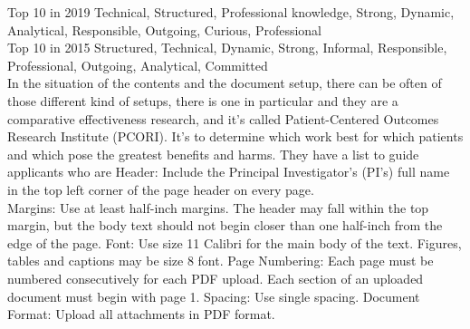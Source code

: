 Top 10 in 2019
Technical,
Structured,
Professional knowledge,
Strong,
Dynamic,
Analytical,
Responsible,
Outgoing,
Curious,
Professional \\

Top 10 in 2015
Structured,
Technical,
Dynamic,
Strong,
Informal,
Responsible,
Professional,
Outgoing,
Analytical,
Committed \\

In the situation of the contents and the document setup, there can be often of those different kind of setups,
there is one in particular and they are a comparative effectiveness research, and it's called
Patient-Centered Outcomes Research Institute (PCORI).
It's to determine which work best for which patients and which pose the greatest benefits and harms. %
They have a list to guide applicants who are
Header: Include the Principal Investigator’s (PI’s) full name in the top left corner of the page header on every page. \\
Margins: Use at least half-inch margins. The header may fall within the top margin, but the body text should not begin closer than one half-inch from the edge of the page.
Font: Use size 11 Calibri for the main body of the text. Figures, tables and captions may be size 8 font.
Page Numbering: Each page must be numbered consecutively for each PDF upload. Each section of an uploaded document must begin with page 1.
Spacing: Use single spacing.
Document Format: Upload all attachments in PDF format.
